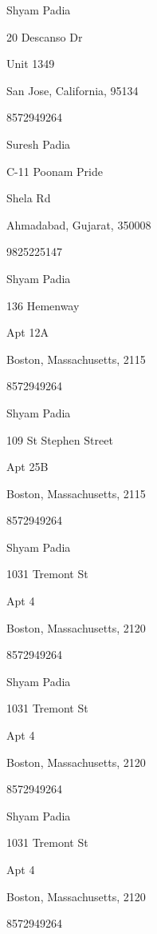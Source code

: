 \documentclass[a4paper]{article}
\begin{document}
\begin{multicols}{2}
\begin{framed}
Shyam Padia\par
20 Descanso Dr\par
Unit 1349\par
San Jose, California, 95134\par
8572949264
\end{framed}
\begin{framed}
Suresh Padia\par
C-11 Poonam Pride\par
Shela Rd\par
Ahmadabad, Gujarat, 350008\par
9825225147
\end{framed}
\begin{framed}
Shyam Padia\par
136 Hemenway\par
Apt 12A\par
Boston, Massachusetts, 2115\par
8572949264
\end{framed}
\begin{framed}
Shyam Padia\par
109 St Stephen Street\par
Apt 25B\par
Boston, Massachusetts, 2115\par
8572949264
\end{framed}
\begin{framed}
Shyam Padia\par
1031 Tremont St\par
Apt 4\par
Boston, Massachusetts, 2120\par
8572949264
\end{framed}
\begin{framed}
Shyam Padia\par
1031 Tremont St\par
Apt 4\par
Boston, Massachusetts, 2120\par
8572949264
\end{framed}
\begin{framed}
Shyam Padia\par
1031 Tremont St\par
Apt 4\par
Boston, Massachusetts, 2120\par
8572949264
\end{framed}
\begin{framed}

\end{framed}
\end{multicols}
\end{document}
